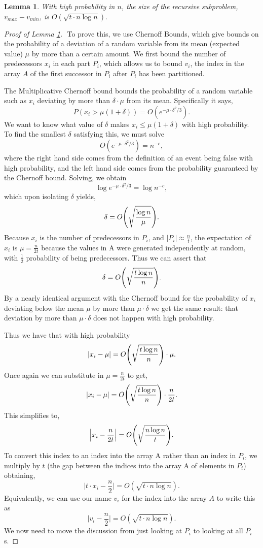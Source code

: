 \documentclass[twocolumn, twoside, 12pt]{article}
\DeclarePairedDelimiter{\paren}{(}{)}
\renewcommand{\paragraph}[1]{\vspace{0.09in}\noindent{\bf \boldmath #1.}}
\newtheorem{lemma}{Lemma}
\begin{document}
\begin{lemma}
With high probability in $n$, the size of the recursive subproblem, $v_{max} - v_{min}$, is $O(\sqrt{t\cdot n\log n}).$
\label{lem:epsSmallFP}
\end{lemma}

\begin{proof}[Proof of Lemma \ref{lem:epsSmallFP}]
$ $\newline
\paragraph{A Single $P_i$}
To prove this, we use Chernoff Bounds, which give bounds on the probability of a deviation of a random variable from its mean (expected value) $\mu$ by more than a certain amount.
We first bound the number of predecessors $x_i$ in each part $P_i$, which allows us to bound $v_i$, the index in the array $A$ of the first successor in $P_i$ after $P_i$ has been partitioned.

The Multiplicative Chernoff bound bounds the probability of a random variable such as $x_i$ deviating by more than $\delta \cdot \mu$ from its mean.
Specifically it says,
$$P(x_i>\mu(1+\delta)) = O(e^{-\mu \cdot \delta^2/3}).$$
We want to know what value of $\delta$ makes $x_i\leq\mu(1+\delta)$ with high probability.
To find the smallest $\delta$ satisfying this, we must solve 
$$O(e^{-\mu \cdot \delta^2/3}) = n^{-c},$$
where the right hand side comes from the definition of an event being false with high probability, and the left hand side comes from the probability guaranteed by the Chernoff bound.
Solving, we obtain 
$$\log e^{-\mu \cdot \delta^2/3} = \log n^{-c},$$
which upon isolating $\delta$ yields,
$$\delta = O\paren*{\sqrt{\frac{\log n}{\mu}}}.$$
Because $x_i$ is the number of predecessors in $P_i$, and $|P_i| \approx \frac{n}{t}$, the expectation of $x_i$ is $\mu = \frac{n}{2t}$ because the values in A were generated independently at random, with $\frac{1}{2}$ probability of being predecessors.
Thus we can assert that 
$$\delta = O\paren*{\sqrt{\frac{t\log n}{n}}}.$$
By a nearly identical argument with the Chernoff bound for the probability of $x_i$ deviating below the mean $\mu$ by more than $\mu \cdot \delta$ we get the same result: that deviation by more than $\mu \cdot \delta$ does not happen with high probability.

Thus we have that with high probability
$$|x_i - \mu| = O\paren*{\sqrt{\frac{t\log n}{n}}} \cdot \mu.$$
Once again we can substitute in $\mu=\frac{n}{2t}$ to get,
$$|x_i - \mu| = O\paren*{\sqrt{\frac{t\log n}{n}}} \cdot \frac{n}{2t}.$$
This simplifies to,
$$\Big|x_i - \frac{n}{2t}\Big| = O\paren*{\sqrt{\frac{n\log n}{t}}}.$$
To convert this index to an index into the array A rather than an index in $P_i$, we multiply by $t$ (the gap between the indices into the array A of elements in $P_i$) obtaining,
$$\Big|t\cdot x_i - \frac{n}{2}\Big| = O(\sqrt{t\cdot n\log n}).$$
Equivalently, we can use our name $v_i$ for the index into the array $A$ to write this as
$$\Big|v_i - \frac{n}{2}\Big| = O(\sqrt{t\cdot n\log n}).$$
We now need to move the discussion from just looking at $P_i$ to looking at all $P_i$s.


\end{proof}
\end{document}
